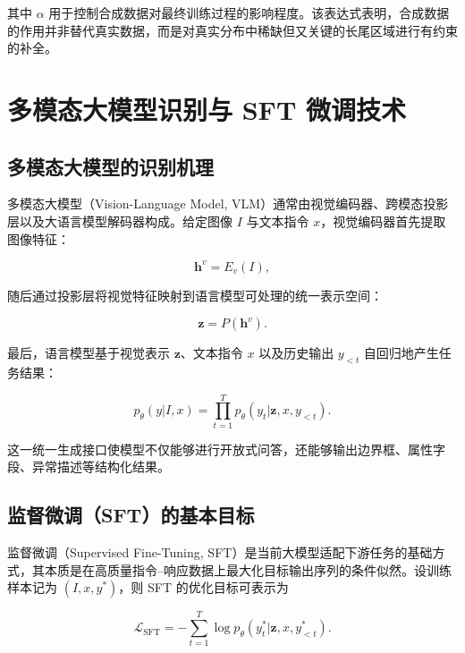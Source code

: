 其中 $\alpha$ 用于控制合成数据对最终训练过程的影响程度。该表达式表明，合成数据的作用并非替代真实数据，而是对真实分布中稀缺但又关键的长尾区域进行有约束的补全。

\section{多模态大模型识别与 SFT 微调技术}

\subsection{多模态大模型的识别机理}

多模态大模型（Vision-Language Model, VLM）通常由视觉编码器、跨模态投影层以及大语言模型解码器构成\cite{liu2023visualinstruction,wang2024qwen2}。给定图像 $I$ 与文本指令 $x$，视觉编码器首先提取图像特征：

\begin{equation}
\mathbf{h}^{v}=E_{v}(I),
\end{equation}

随后通过投影层将视觉特征映射到语言模型可处理的统一表示空间：

\begin{equation}
\mathbf{z}=P(\mathbf{h}^{v}).
\end{equation}

最后，语言模型基于视觉表示 $\mathbf{z}$、文本指令 $x$ 以及历史输出 $y_{<t}$ 自回归地产生任务结果：

\begin{equation}
p_{\theta}(y|I,x)=\prod_{t=1}^{T}p_{\theta}(y_t|\mathbf{z},x,y_{<t}).
\end{equation}

这一统一生成接口使模型不仅能够进行开放式问答，还能够输出边界框、属性字段、异常描述等结构化结果。

\subsection{监督微调（SFT）的基本目标}

监督微调（Supervised Fine-Tuning, SFT）是当前大模型适配下游任务的基础方式，其本质是在高质量指令--响应数据上最大化目标输出序列的条件似然\cite{ouyang2022training,liu2023visualinstruction}。设训练样本记为 $(I,x,y^{*})$，则 SFT 的优化目标可表示为

\begin{equation}
\mathcal{L}_{\text{SFT}}=-\sum_{t=1}^{T}\log p_{\theta}(y_t^{*}|\mathbf{z},x,y_{<t}^{*}).
\end{equation}

